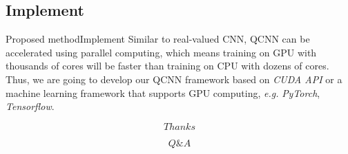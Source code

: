 \documentclass{beamer}
\begin{document}
\subsection{Implement}
\begin{frame}{Proposed method}{Implement}
Similar to real-valued CNN, QCNN can be accelerated using parallel computing, which means training on GPU with thousands of cores will be faster than training on CPU with dozens of cores. Thus, we are going to develop our QCNN framework based on \emph{CUDA API} or a machine learning framework that supports GPU computing, \emph{e.g.} \emph{PyTorch}, \emph{Tensorflow}.
\end{frame}
\begin{frame}
    $$Thanks$$
\end{frame}
\begin{frame}
    $$Q\&A$$
\end{frame}

 
\end{document}

